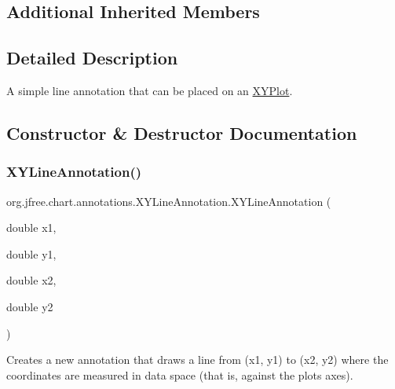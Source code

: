 \subsection*{Additional Inherited Members}


\subsection{Detailed Description}
A simple line annotation that can be placed on an \mbox{\hyperlink{}{X\+Y\+Plot}}. 

\subsection{Constructor \& Destructor Documentation}
\mbox{\label{classorg_1_1jfree_1_1chart_1_1annotations_1_1_x_y_line_annotation_a68dc6a5e5a4f72e94a0ae52b72c9058c}} 
\subsubsection{\texorpdfstring{X\+Y\+Line\+Annotation()}{XYLineAnnotation()}\hspace{0.1cm}{\footnotesize\ttfamily [1/2]}}
{\footnotesize\ttfamily org.\+jfree.\+chart.\+annotations.\+X\+Y\+Line\+Annotation.\+X\+Y\+Line\+Annotation (\begin{DoxyParamCaption}\item[{double}]{x1,  }\item[{double}]{y1,  }\item[{double}]{x2,  }\item[{double}]{y2 }\end{DoxyParamCaption})}

Creates a new annotation that draws a line from (x1, y1) to (x2, y2) where the coordinates are measured in data space (that is, against the plot\textquotesingle{}s axes).


